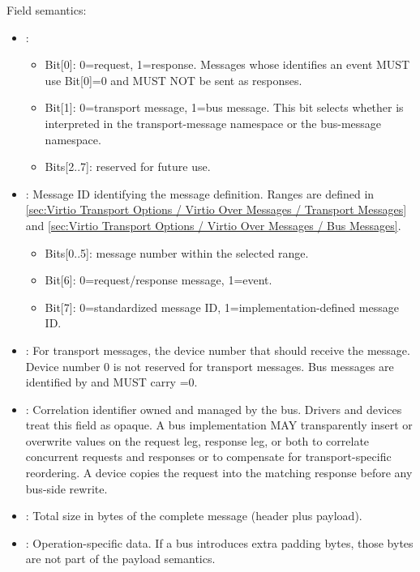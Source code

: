Field semantics:
\begin{itemize}
  \item {}:
    \begin{itemize}
  \item Bit[0]: 0=request, 1=response. Messages whose  identifies
        an event MUST use Bit[0]=0 and MUST NOT be sent as responses.
  \item Bit[1]: 0=transport message, 1=bus message. This bit selects whether
         is interpreted in the transport-message namespace or the
        bus-message namespace.
  \item Bits[2..7]: reserved for future use.
    \end{itemize}
  \item {}: Message ID identifying the message definition. Ranges
    are defined in
    \ref{sec:Virtio Transport Options / Virtio Over Messages / Transport Messages}
    and
    \ref{sec:Virtio Transport Options / Virtio Over Messages / Bus Messages}.
    \begin{itemize}
  \item Bits[0..5]: message number within the selected range.
  \item Bit[6]: 0=request/response message, 1=event.
  \item Bit[7]: 0=standardized message ID, 1=implementation-defined message ID.
    \end{itemize}
  \item {}: For transport messages, the device number that should
    receive the message. Device number 0 is not reserved for transport
    messages. Bus messages are identified by  and MUST carry
    =0.
  \item {}: Correlation identifier owned and managed by the bus.
    Drivers and devices treat this field as opaque. A bus implementation MAY
    transparently insert or overwrite  values on the request leg,
    response leg, or both to correlate concurrent requests and responses or to
    compensate for transport-specific reordering. A device copies the request
     into the matching response before any bus-side rewrite.
  \item {}: Total size in bytes of the complete message (header
    plus payload).
  \item {}: Operation-specific data. If a bus introduces extra
    padding bytes, those bytes are not part of the payload semantics.
\end{itemize}

